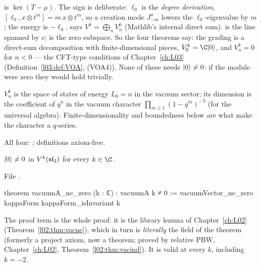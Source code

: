 \begin{dictionary}
\allowbreak{}\allowbreak{} is $\ker(T-\mu)$. The sign is deliberate: $\ell_0$ is the
\emph{degree derivation}, $[\ell_0,x\otimes t^m] = m\,x\otimes t^m$, so a creation mode $J^a_{-m}$
lowers the $\ell_0$-eigenvalue by $m$; the energy is $-\ell_0$.  says
$V^k = \bigoplus_n V^k_n$ (Mathlib's internal direct sum).  is the line spanned by $v$;
 is the zero subspace. So the four theorems say: the grading is a direct-sum decomposition
with finite-dimensional pieces, $V^k_0 = \C\leightvac$, and $V^k_n = 0$ for $n<0$ --- the CFT-type
conditions of Chapter~\ref{ch:L03} (Definition~\ref{l03:def:VOA}, (VOA4)). None of these needs
$|0\rangle\ne0$: if the module were zero they would hold trivially.
\end{dictionary}

\begin{physics}
$V^k_n$ is the space of states of energy $L_0 = n$ in the vacuum sector; its dimension is the
coefficient of $q^n$ in the vacuum character $\prod_{m\ge1}(1-q^m)^{-3}$ (for the universal algebra).
Finite-dimensionality and boundedness below are what make the character a $q$-series.
\end{physics}

\begin{status}
All four: \lean{[propext, Classical.}\allowbreak{}\allowbreak\lean{sound]}; definitions axiom-free.
\end{status}

\begin{theorem}\label{l08:thm:vacpbw}
$|0\rangle\ne0$ in $V^k(\mathfrak{sl}_2)$ for every $k\in\C$.
\end{theorem}

\noindent File .
\begin{leancode}
theorem vacuumA_ne_zero (k : ℂ) : vacuumA k ≠ 0 :=
  vacuumVector_ne_zero kappaForm kappaForm_isInvariant k
\end{leancode}

\begin{dictionary}
The proof term is the whole proof: it is the library lemma \allowbreak{}\allowbreak{}\allowbreak{} of
Chapter~\ref{ch:L02} (Theorem~\ref{l02:thm:vacne}), which in turn is \emph{literally} the field
 of the theorem  (formerly a project axiom, now a theorem; proved by relative PBW,
Chapter~\ref{ch:L02}, Theorem~\ref{l02:thm:vacind}). It is valid at every $k$, including $k=-2$.
\end{dictionary}


